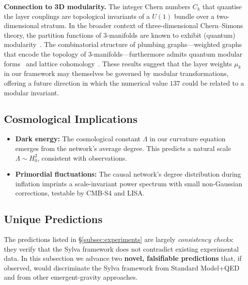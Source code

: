 \documentclass[11pt,a4paper]{article}
\theoremstyle{definition}
\theoremstyle{remark}
\begin{document}
\textbf{Connection to 3D modularity.} The integer Chern numbers $C_{k}$ that
quantise the layer couplings are topological invariants of a $U(1)$ bundle
over a two-dimensional stratum. In the broader context of three-dimensional
Chern--Simons theory, the partition functions of 3-manifolds are known to
exhibit (quantum) modularity~\cite{Cheng2019,Gukov2017}. The combinatorial
structure of plumbing graphs---weighted graphs that encode the topology of
3-manifolds---furthermore admits quantum modular forms~\cite{Bringmann2020}
and lattice cohomology~\cite{Akhmechet2021}. These results suggest that the
layer weights $\mu_{k}$ in our framework may themselves be governed by modular
transformations, offering a future direction in which the numerical value
$137$ could be related to a modular invariant.

\subsection{Cosmological Implications}\label{subsec:cosmology}

\begin{itemize}[noitemsep]
\item \textbf{Dark energy:} The cosmological constant $\Lambda$ in our curvature
equation emerges from the network's average degree. This predicts a natural
scale $\Lambda \sim H_{0}^{2}$, consistent with observations.
\item \textbf{Primordial fluctuations:} The causal network's degree distribution
during inflation imprints a scale-invariant power spectrum with small
non-Gaussian corrections, testable by CMB-S4 and LISA.
\end{itemize}

\subsection{Unique Predictions}\label{subsec:unique-predictions}

The predictions listed in \S\ref{subsec:experiments} are largely
\emph{consistency checks}: they verify that the Sylva framework does not
contradict existing experimental data.  In this subsection we advance two
\textbf{novel, falsifiable predictions} that, if observed, would discriminate
the Sylva framework from Standard Model+QED and from other emergent-gravity
approaches.
\end{document}
